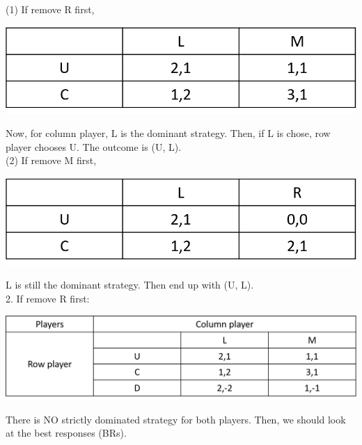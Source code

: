 \documentclass[12pt]{article}
\begin{document}
\begin{spacing}{1.5}
            (1) If remove R first, 
            
            \begin{center}
                \includegraphics[scale = 0.5]{pic/remove_D_then_R.png}
            \end{center}
            
            Now, for column player, L is the dominant strategy. 
            Then, if L is chose, row player chooses U.
            The outcome is (U, L).\\

            (2) If remove M first,

            \begin{center}
                \includegraphics[scale = .5]{pic/remove_D_then_M.png}
            \end{center}
         
            L is still the dominant strategy.
            Then end up with (U, L).\\


            2. If remove R first:\\
            
            \begin{center}
                \includegraphics[scale = 0.5]{pic/remove_R_first.png}
            \end{center}

            There is NO strictly dominated strategy for both players.
            Then, we should look at the best responses (BRs).\\


\end{spacing}
\end{document}
